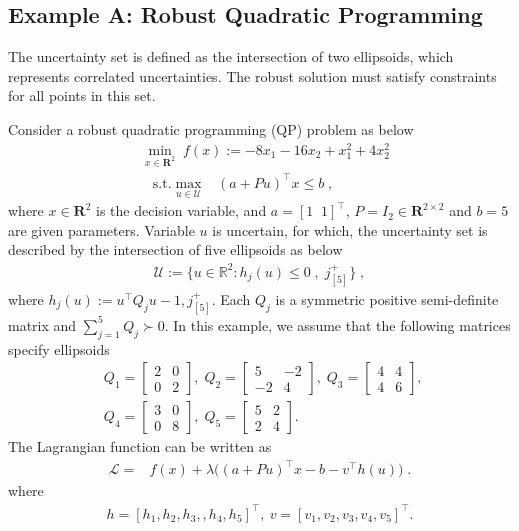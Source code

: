 \documentclass[journal,twoside,web]{ieeecolor}
\newcommand{\rev}[1]{\textcolor{revisionblue}{#1}}
\begin{document}
\subsection*{\rev{Example A: Robust Quadratic Programming}}

The uncertainty set is defined as the intersection of two ellipsoids, which represents correlated uncertainties. The robust solution must satisfy constraints for all points in this set.

Consider a robust quadratic programming (QP) problem as below
\begin{align} \label{ro_simulation}
&\min_{x \in \mathbf{R}^2} \;f(x):=-8x_1-16x_2+x_1^2+4x_2^2\nonumber\\
&\;\;\;\text{s.t.} \max_{u\in \mathcal{U}} \;\;\; (a+Pu)^\top x\leq b\;,
\end{align}
where $x \in \mathbf{R}^2$ is the decision variable, and $a =[1\;\;1]^\top$, $P=I_2 \in \mathbf{R}^{2 \times 2}$ and $b=5$ are given parameters. Variable $u$ is uncertain, for which, the uncertainty set is described by the intersection of five ellipsoids as below
\begin{align*}\mathcal{U}:=\{u \in \mathbb{R}^{2}:h_{j}(u) \leq 0\;,\; j^+_{[5]}\}\;,\end{align*}
where
$h_j(u):=u^\top Q_j u-1, j^+_{[5]}$. Each $Q_{j}$ is a symmetric positive semi-definite matrix and $ \sum_{j=1}^{5} Q_j \succ 0$. In this example, we assume that the following matrices specify ellipsoids
\begin{align*}
&Q_1=\left[\begin{array}{ccl} 2 & 0\\0 & 2 \end{array}\right],\; Q_2=\left[\begin{array}{ccl} 5 & -2\\-2 & 4  \end{array}\right],\; Q_3=\left[\begin{array}{ccl} 4 & 4\\4 & 6\end{array}\right],\;\\
&Q_4=\left[\begin{array}{ccl} 3 & 0\\0 & 8 \end{array}\right],\;
Q_5=\left[\begin{array}{ccl} 5 & 2\\2 & 4 \end{array}\right].
\end{align*}
The Lagrangian function can be written as
\begin{align*}
\mathcal{L}=&f(x)+\lambda \big((a+Pu)^\top x-b-v ^\top h(u)\big)\;.
\end{align*}
where
\begin{align*}
h=[h_1,h_2,h_3,,h_4,h_5]^\top ,\ v=[v_1,v_2,v_3,v_4,v_5]^\top.
\end{align*}
\end{document}
